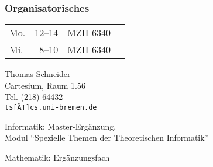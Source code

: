     \begin{frame}
      \frametitle{Organisatorisches}

          \par\smallskip
          \begin{tabular}{@{}l@{~}r@{~~}l@{~~}l@{}}
            Mo. & 12--14 & MZH 6340 \\
            Mi. &  8--10 & MZH 6340
          \end{tabular}
          \par\bigskip
          \par\smallskip
          Thomas Schneider \\
          Cartesium, Raum 1.56 \\
          Tel. (218) 64432 \\
          \texttt{ts[ÄT]cs.uni-bremen.de}
          \par\bigskip
          \par\smallskip
          Informatik: Master-Ergänzung,\\
          Modul "`Spezielle Themen der Theoretischen Informatik"'
          \par\smallskip
          Mathematik: Ergänzungsfach

    \end{frame}
          
